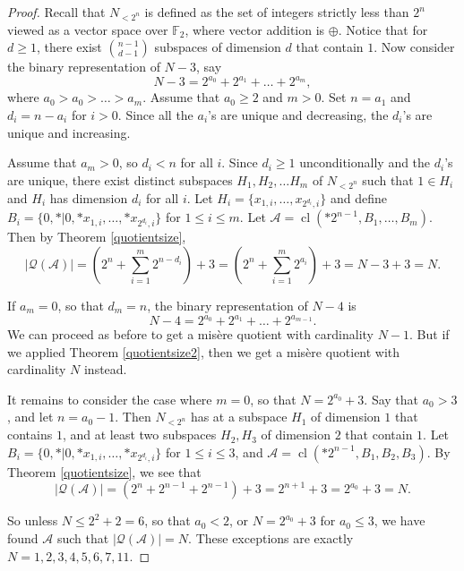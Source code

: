 \documentclass[10pt,a4paper]{amsart}
\DeclareMathOperator{\cl}{cl}
\begin{document}
\begin{proof}

Recall that $N_{<2^n}$ is defined as the set of integers strictly less than $2^n$ viewed as a vector space over $\mathbb{F}_2$, where vector addition is $\oplus$. Notice that for $d\geq 1$, there exist $\binom{n-1}{d-1}$ subspaces of dimension $d$ that contain $1$. Now consider the binary representation of $N -3$, say \begin{equation}
    N-3 = 2^{a_0} + 2^{a_1} + \dots + 2^{a_{m}},
\end{equation}
where $a_0> a_0 > \dots > a_{m}$. Assume that $a_0 \geq 2$ and $m >0$. Set $n = a_1$ and $d_i = n - a_{i}$ for $i>0$. Since all the $a_i$'s are unique and decreasing, the $d_i$'s are unique and increasing. 

Assume that $a_m > 0$, so $d_i < n$ for all $i$.
Since $d_i \geq 1$ unconditionally and the $d_i$'s are unique, there exist distinct subspaces $H_1,H_2,\dots H_m$ of $N_{<2^n}$ such that $1 \in H_i$ and $H_i$ has dimension $d_i$ for all $i$. Let $H_i = \{x_{1,i},\dots,x_{2^{d_i},i}\}$ and define $B_i = \{0,*|0,*x_{1,i},\dots,*x_{2^{d_i},i}\}$ for $1 \leq i \leq m$. Let $\mathscr{A} = \cl( *2^{n-1},B_1,\dots,B_m ) $. Then by Theorem \ref{quotientsize}, \begin{equation}
    \left |\mathcal{Q} (\mathscr{A})\right | = \left( 2^n +\sum_{i=1}^m 2^{n-d_i} \right) +3 = \left( 2^n +\sum_{i=1}^m 2^{a_i} \right) +3 = N-3+3=N.
\end{equation}

If $a_m = 0$, so that $d_m = n$, the binary representation of $N-4$ is \begin{equation}
   N-4 = 2^{a_0} + 2^{a_1} + \dots + 2^{a_{m-1}}.
\end{equation}
We can proceed as before to get a mis\`ere quotient with cardinality $N-1$. But if we applied Theorem \ref{quotientsize2}, then we get a mis\`ere quotient with cardinality $N$ instead.

It remains to consider the case where $ m  =0$, so that $N = 2^{a_0} + 3$. Say that $a_0 > 3$, and let $n = a_0 -1$. Then $N_{<2^n}$ has at a subspace $H_1$ of dimension $1$ that contains $1$, and at least two subspaces $H_2,H_3$ of dimension $2$ that contain $1$.  Let  $B_i = \{0,*|0,*x_{1,i},\dots,*x_{2^{d_i},i}\}$ for $1 \leq i \leq 3$, and $\mathscr{A} = \cl( *2^{n-1},B_1,B_2,B_3 ) $. By Theorem \ref{quotientsize}, we see that \begin{equation}
    |\mathcal{Q}(\mathscr{A})| = \left(2^{n} + 2^{n-1} + 2^{n-1} \right)+3 = 2^{n+1}+3 = 2^{a_0}+3 =N.
\end{equation}

So unless $N \leq 2^2+2 = 6$, so that $a_0 < 2$, or $N = 2^{a_0} + 3$ for $a_0 \leq 3$, we have found $\mathscr{A}$ such that $|\mathcal{Q}(\mathscr{A})| = N$. These exceptions are exactly $N = 1,2,3,4,5,6,7,11$.
\end{proof}
\end{document}

